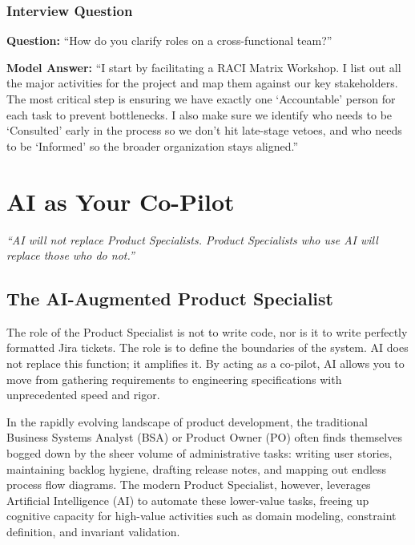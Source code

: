 \documentclass[
  11pt,
  openany,
  oneside]{book}
\renewenvironment{quote}{\begin{customquote}}{\end{customquote}}
\begin{document}
\subsection{Interview Question}\label{interview-question-1}

\textbf{Question:} ``How do you clarify roles on a cross-functional
team?''

\textbf{Model Answer:} ``I start by facilitating a RACI Matrix Workshop.
I list out all the major activities for the project and map them against
our key stakeholders. The most critical step is ensuring we have exactly
one `Accountable' person for each task to prevent bottlenecks. I also
make sure we identify who needs to be `Consulted' early in the process
so we don't hit late-stage vetoes, and who needs to be `Informed' so the
broader organization stays aligned.''

\chapter{AI as Your Co-Pilot}\label{ai-as-your-co-pilot}

\begin{quote}
\emph{``AI will not replace Product Specialists. Product Specialists who
use AI will replace those who do not.''}
\end{quote}

\section{The AI-Augmented Product
Specialist}\label{the-ai-augmented-product-specialist}

The role of the Product Specialist is not to write code, nor is it to
write perfectly formatted Jira tickets. The role is to define the
boundaries of the system. AI does not replace this function; it
amplifies it. By acting as a co-pilot, AI allows you to move from
gathering requirements to engineering specifications with unprecedented
speed and rigor.

In the rapidly evolving landscape of product development, the
traditional Business Systems Analyst (BSA) or Product Owner (PO) often
finds themselves bogged down by the sheer volume of administrative
tasks: writing user stories, maintaining backlog hygiene, drafting
release notes, and mapping out endless process flow diagrams. The modern
Product Specialist, however, leverages Artificial Intelligence (AI) to
automate these lower-value tasks, freeing up cognitive capacity for
high-value activities such as domain modeling, constraint definition,
and invariant validation.
\end{document}
